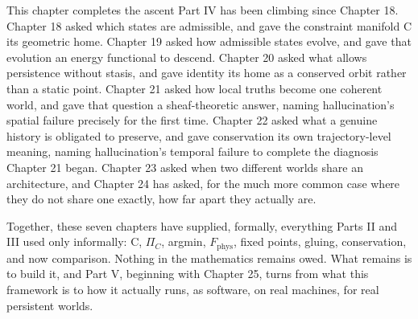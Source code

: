 This chapter completes the ascent Part IV has been climbing since Chapter 18. Chapter 18 asked which states are admissible, and gave the constraint manifold C its geometric home. Chapter 19 asked how admissible states evolve, and gave that evolution an energy functional to descend. Chapter 20 asked what allows persistence without stasis, and gave identity its home as a conserved orbit rather than a static point. Chapter 21 asked how local truths become one coherent world, and gave that question a sheaf-theoretic answer, naming hallucination's spatial failure precisely for the first time. Chapter 22 asked what a genuine history is obligated to preserve, and gave conservation its own trajectory-level meaning, naming hallucination's temporal failure to complete the diagnosis Chapter 21 began. Chapter 23 asked when two different worlds share an architecture, and Chapter 24 has asked, for the much more common case where they do not share one exactly, how far apart they actually are.

Together, these seven chapters have supplied, formally, everything Parts II and III used only informally: C, \(\Pi_C\), argmin, \(F_{\mathrm{phys}}\), fixed points, gluing, conservation, and now comparison. Nothing in the mathematics remains owed. What remains is to build it, and Part V, beginning with Chapter 25, turns from what this framework is to how it actually runs, as software, on real machines, for real persistent worlds.
